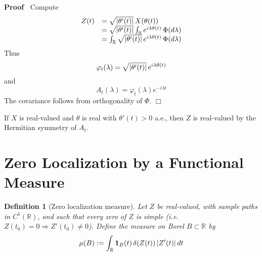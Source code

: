 \documentclass{article}
\newcommand{\assign}{:=}
\newenvironment{proof}{\noindent\textbf{Proof\ }}{\hspace*{\fill}$\Box$\medskip}
\newtheorem{definition}{Definition}
\begin{document}
\begin{proof}
  Compute
  \begin{equation}
    \begin{array}{ll}
      Z (t) & = \sqrt{| \theta' (t) |}  \hspace{0.17em} X (\theta (t))\\
      & = \sqrt{| \theta' (t) |}  \int_{\mathbb{R}} e^{i \lambda \theta (t)} 
      \hspace{0.17em} \Phi (d \lambda)\\
      & = \int_{\mathbb{R}} \sqrt{| \theta' (t) |}  \hspace{0.17em} e^{i
      \lambda \theta (t)}  \hspace{0.17em} \Phi (d \lambda)
    \end{array}
  \end{equation}
  Thus
  \begin{equation}
    \varphi_t (\lambda) = \sqrt{| \theta' (t) |}  \hspace{0.17em} e^{i \lambda
    \theta (t)}
  \end{equation}
  and
  \begin{equation}
    A_t (\lambda) = \varphi_t (\lambda) e^{- i \lambda t}
  \end{equation}
  The covariance follows from orthogonality of $\Phi$.
\end{proof}

\begin{remark}
   If $X$ is real-valued and $\theta$ is
  real with $\theta' (t) > 0$ a.e., then $Z$ is real-valued by the Hermitian
  symmetry of $A_t$.
\end{remark}

\section{Zero Localization by a Functional Measure}

\begin{definition}
  [Zero localization measure] Let $Z$ be real-valued, with sample paths in
  $C^1 (\mathbb{R})$, and such that every zero of $Z$ is simple (i.e. $Z (t_0)
  = 0 \Longrightarrow Z' (t_0) \neq 0$). Define the measure on Borel $B
  \subset \mathbb{R}$ by
  \begin{equation}
    \mu (B) \assign \int_{\mathbb{R}} \textbf{1}_B (t)  \hspace{0.17em} \delta
    (Z (t)) \hspace{0.17em} |Z' (t) |  \hspace{0.17em} dt
  \end{equation}
\end{definition}
\end{document}
